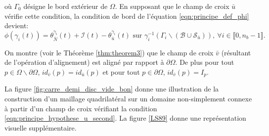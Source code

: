 où $\Gamma_0$ désigne le bord extérieur de $\Omega$. En supposant que le champ de croix $\bar{u}$ vérifie cette condition, la condition de bord de l'équation \eqref{eqn:principe_def_phi} devient:
$$
\phi(\gamma_i(t))=\theta_{\bar{N}}^{\gamma_i}(t)+\mathcal{I}(t)-\theta_{\bar{u}}^{\gamma_i}(t) \mbox{ sur } \gamma_i^{-1}(\Gamma_i\backslash(\mathcal{B}\cup\mathcal{S}_{\bar{u}})),~\forall i\in\llbracket 0, n_b-1\rrbracket.
$$
\begin{remark}
    On montre (voir le Théorème \ref{thm:theorem3}) que le champ de croix $\bar{v}$ (résultant de l'opération d'alignement) est aligné par rapport à $\partial\Omega$. De plus pour tout $p\in\Omega\backslash\partial\Omega$, $id_{\bar{v}}(p)=id_{\bar{u}}(p)$ et pour tout $p\in\partial\Omega$, $id_{\bar{v}}(p)=I_p$.
\end{remark}
La figure \ref{fig:carre_demi_disc_vide_bon} donne une illustration de la construction d'un maillage quadrilatéral sur un domaine non-simplement connexe à partir d'un champ de croix vérifiant la condition \ref{eqn:principe_hypothese_u_second}. La figure \ref{LS89} donne une représentation visuelle supplémentaire.

